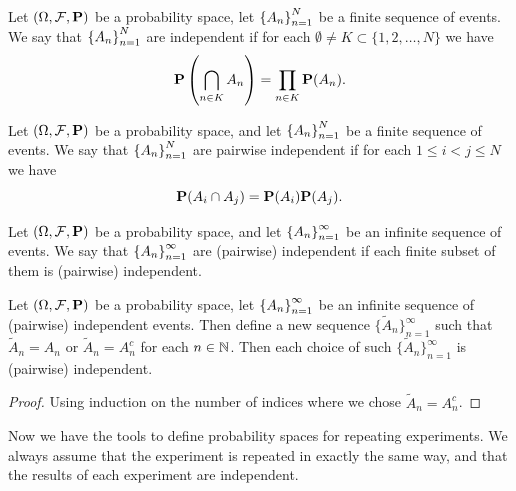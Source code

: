 \documentclass[11pt,a4paper]{article}
\begin{document}
\begin{definition}
  Let $(\Omega, \mathcal F, \mathbf{P})$ be a probability space,
  let $\left\{A_n\right\}_{n=1}^{N}$ be a finite sequence of events.
  We say that $\left\{A_n\right\}_{n=1}^{N}$ are independent if for each 
  $\emptyset \neq K \subset \{1,2,\dots,N\}$ we have
  \[
    \mathbf{P}\left(\bigcap_{n \in K} A_n\right) = 
    \prod_{n \in K} \mathbf{P}(A_n).
  \]
\end{definition}

\begin{definition}
  Let $(\Omega, \mathcal F, \mathbf{P})$ be a probability space,
  and let $\left\{A_n\right\}_{n=1}^{N}$ be a finite sequence of events.
  We say that $\left\{A_n\right\}_{n=1}^{N}$ are pairwise independent if for each 
  $1 \le i < j \le N$ we have
  \[
    \mathbf{P}(A_i \cap A_j) = 
    \mathbf{P}(A_i) \mathbf{P}(A_j).
  \]
\end{definition}

\begin{definition}
  Let $(\Omega, \mathcal F, \mathbf{P})$ be a probability space,
  and let $\left\{A_n\right\}_{n=1}^{\infty}$ be an infinite sequence of events.
  We say that $\left\{A_n\right\}_{n=1}^{\infty}$ are (pairwise) independent if each
  finite subset of them is (pairwise) independent.
\end{definition}

\begin{proposition}\label{prop:indp}
  Let $(\Omega, \mathcal F, \mathbf{P})$ be a probability space,
  let $\left\{A_n\right\}_{n=1}^{\infty}$ be an infinite sequence of  (pairwise) 
  independent events. Then define a new sequence 
  $\{\widetilde{A}_n\}_{n=1}^{\infty}$ such that $\widetilde{A}_n = A_n$ or
  $\widetilde{A}_n = A_n^c$ for each $n \in \mathbb{N}$. Then each choice of such
  $\{\widetilde{A}_n\}_{n=1}^{\infty}$ is (pairwise) independent.
\end{proposition}
\begin{proof}
  Using induction on the number of indices where we chose
  $\widetilde{A}_n = A_n^c$.
\end{proof}

\begin{remark}
  Now we have the tools to define probability spaces for repeating experiments.
  We always assume that the experiment is repeated in exactly the same way,
  and that the results of each experiment are independent.
\end{remark}
\end{document}
